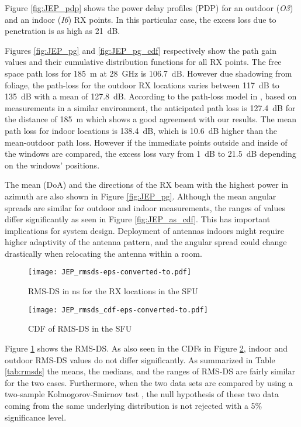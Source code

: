 \documentclass[conference]{IEEEtran}
\begin{document}
Figure \ref{fig:JEP_pdp} shows the power delay profiles (PDP) for an outdoor ({\em O3}) and an indoor ({\em I6}) RX points. In this particular case, the excess loss due to penetration is as high as \SI{21}{dB}. 

Figures \ref{fig:JEP_pg} and \ref{fig:JEP_pg_cdf} respectively show the path gain values and their cumulative distribution functions for all RX points. The free space path loss for \SI{185}{m} at \SI{28}{GHz} is \SI{106.7}{dB}. However due shadowing from foliage, the path-loss for the outdoor RX locations varies between \SI{117}{dB} to \SI{135}{dB} with a mean of \SI{127.8}{dB}. According to the path-loss model in \cite{bas_2017_microcell}, based on measurements in a similar environment, the anticipated path loss is \SI{127.4}{dB} for the distance of \SI{185}{m} which shows a good agreement with our results. The mean path loss for indoor locations is \SI{138.4}{dB}, which is \SI{10.6}{dB} higher than the mean-outdoor path loss. However if the immediate points outside and inside of the windows are compared, the excess loss vary from \SI{1}{dB} to \SI{21.5}{dB} depending on the windows' positions. 

The mean (DoA) and the directions of the RX beam with the highest power in azimuth are also shown in Figure \ref{fig:JEP_pg}. Although the mean angular spreads are similar for outdoor and indoor measurements, the ranges of values differ significantly as seen in Figure \ref{fig:JEP_as_cdf}.  This has important implications for system design. Deployment of antennas indoors might require higher adaptivity of the antenna pattern, and the angular spread could change drastically when relocating the antenna within a room. 

\begin{figure}[tbp]
        \centering\texttt{[image: JEP\_rmsds-eps-converted-to.pdf]}\caption{RMS-DS in ns for the RX locations in the SFU}\label{fig:JEP_rmsds}
\end{figure}

\begin{figure}[tbp]
        \centering\texttt{[image: JEP\_rmsds\_cdf-eps-converted-to.pdf]}\caption{CDF of RMS-DS in the SFU}\label{fig:JEP_rmsds_cdf}
\end{figure}

Figure \ref{fig:JEP_rmsds} shows the RMS-DS. As also seen in the CDFs in Figure \ref{fig:JEP_rmsds_cdf}, indoor and outdoor RMS-DS values do not differ significantly. As summarized in Table \ref{tab:rmsds} the means, the medians, and the ranges of RMS-DS are fairly similar for the two cases. Furthermore, when the two data sets are compared by using a two-sample Kolmogorov-Smirnov test \cite{massey_1951_kolmogorov}, the null hypothesis of these two data coming from the same underlying distribution is not rejected with a 5\% significance level. 
\end{document}
